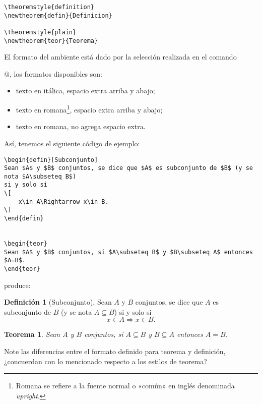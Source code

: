 \documentclass[a4,10pt]{aleph-notas}
\theoremstyle{definition}
\newtheorem{defin}{Definición}
\theoremstyle{plain}
\newtheorem{teor}{Teorema}
\begin{document}
\begin{lstlisting}[frame=single]
\theoremstyle{definition}
\newtheorem{defin}{Definicion}

\theoremstyle{plain}
\newtheorem{teor}{Teorema}
\end{lstlisting}

El formato del ambiente está dado por la selección realizada en el comando \verb@\theoremstyle{@\emph{estilo}\verb@}@, los formatos disponibles son:

\begin{itemize}
    \item \verb@plain@ texto en itálica, espacio extra arriba y abajo;
    \item \verb@definition@ texto en romana\footnote{Romana se refiere a la fuente normal o «común» en inglés denominada \emph{upright}.}, espacio extra arriba y abajo;
    \item \verb@remark@ texto en romana, no agrega espacio extra.
\end{itemize}

Así, tenemos el siguiente código de ejemplo:

\begin{lstlisting}[frame=single]
\begin{defin}[Subconjunto]
Sean $A$ y $B$ conjuntos, se dice que $A$ es subconjunto de $B$ (y se nota $A\subseteq B$)
si y solo si
\[
    x\in A\Rightarrow x\in B.
\]
\end{defin}


\begin{teor}
Sean $A$ y $B$ conjuntos, si $A\subseteq B$ y $B\subseteq A$ entonces $A=B$.
\end{teor}
\end{lstlisting}

\noindent
produce:
\begin{defin}[Subconjunto]
Sean $A$ y $B$ conjuntos, se dice que $A$ es subconjunto de $B$ (y se nota $A\subseteq B$) si y solo si
\[
    x\in A\Rightarrow x\in B.
\]
\end{defin}


\begin{teor}
Sean $A$ y $B$ conjuntos, si $A\subseteq B$ y $B\subseteq A$ entonces $A=B$.
\end{teor}

\begin{advertencia}
Note las diferencias entre el formato definido para teorema y definición, ¿concuerdan con lo mencionado respecto a los estilos de teorema?
\end{advertencia}
\end{document}
